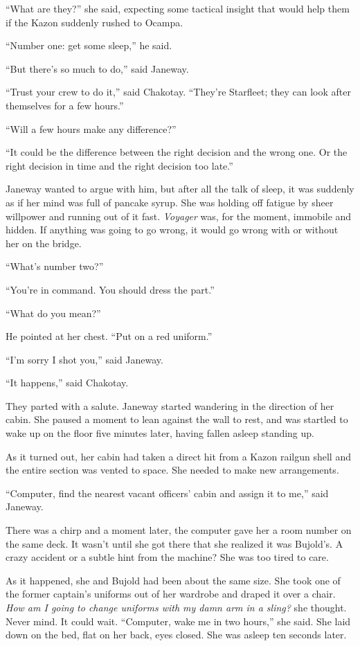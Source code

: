 \documentclass[twoside,letterpaper,12pt]{memoir}
\begin{document}
``What are they?'' she said, expecting some tactical insight that would help them if the Kazon suddenly rushed to Ocampa.

``Number one: get some sleep,'' he said.

``But there's so much to do,'' said Janeway.

``Trust your crew to do it,'' said Chakotay. ``They're Starfleet; they can look after themselves for a few hours.''

``Will a few hours make any difference?''

``It could be the difference between the right decision and the wrong one. Or the right decision in time and the right decision too late.''

Janeway wanted to argue with him, but after all the talk of sleep, it was suddenly as if her mind was full of pancake syrup. She was holding off fatigue by sheer willpower and running out of it fast. \textit{Voyager} was, for the moment, immobile and hidden. If anything was going to go wrong, it would go wrong with or without her on the bridge.

``What's number two?''

``You're in command. You should dress the part.''

``What do you mean?''

He pointed at her chest. ``Put on a red uniform.''

``I'm sorry I shot you,'' said Janeway.

``It happens,'' said Chakotay.

They parted with a salute. Janeway started wandering in the direction of her cabin. She paused a moment to lean against the wall to rest, and was startled to wake up on the floor five minutes later, having fallen asleep standing up.

As it turned out, her cabin had taken a direct hit from a Kazon railgun shell and the entire section was vented to space. She needed to make new arrangements.

``Computer, find the nearest vacant officers' cabin and assign it to me,'' said Janeway.

There was a chirp and a moment later, the computer gave her a room number on the same deck. It wasn't until she got there that she realized it was Bujold's. A crazy accident or a subtle hint from the machine? She was too tired to care.

As it happened, she and Bujold had been about the same size. She took one of the former captain's uniforms out of her wardrobe and draped it over a chair. \textit{How am I going to change uniforms with my damn arm in a sling?} she thought. Never mind. It could wait. ``Computer, wake me in two hours,'' she said. She laid down on the bed, flat on her back, eyes closed. She was asleep ten seconds later.
\end{document}
